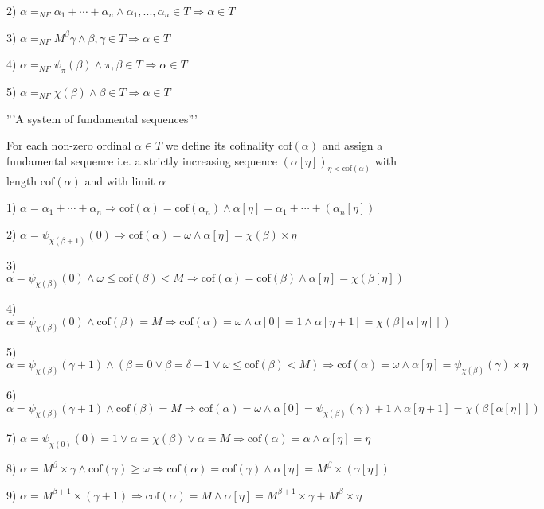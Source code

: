 \documentclass[10pt]{article}
\begin{document}
2) \(\alpha=_{NF}\alpha_1+\cdots+\alpha_n\wedge\alpha_1,...,\alpha_n\in T\Rightarrow\alpha\in T\)

3) \(\alpha=_{NF}M^\beta\gamma\wedge\beta,\gamma\in T\Rightarrow\alpha\in T\)

4) \(\alpha=_{NF}\psi_\pi(\beta)\wedge\pi,\beta\in T\Rightarrow\alpha\in T\)

5) \(\alpha=_{NF}\chi(\beta)\wedge\beta\in T\Rightarrow\alpha\in T\)

'''A system of fundamental sequences'''

For each non-zero ordinal \(\alpha\in T\) we define its cofinality \(\text{cof}(\alpha)\) and assign a fundamental sequence i.e. a strictly increasing sequence \((\alpha[\eta])_{\eta<\text{cof}(\alpha)}\) with length \(\text{cof}(\alpha)\) and with limit \(\alpha\)

1) \(\alpha=\alpha_1+\cdots+\alpha_n\Rightarrow\text{cof}(\alpha)=\text{cof}(\alpha_n)\wedge\alpha[\eta]=\alpha_1+\cdots+(\alpha_n[\eta])\)

2) \(\alpha=\psi_{\chi(\beta+1)}(0)\Rightarrow\text{cof}(\alpha)=\omega\wedge\alpha[\eta]=\chi(\beta)\times \eta\)

3) \(\alpha=\psi_{\chi(\beta)}(0)\wedge\omega\le\text{cof}(\beta)<M\Rightarrow\text{cof}(\alpha)=\text{cof}(\beta)\wedge\alpha[\eta]=\chi(\beta[\eta])\)

4) \(\alpha=\psi_{\chi(\beta)}(0)\wedge\text{cof}(\beta)=M\Rightarrow\text{cof}(\alpha)=\omega\wedge\alpha[0]=1\wedge\alpha[\eta+1]=\chi(\beta[\alpha[\eta]])\)

5)  \(\alpha=\psi_{\chi(\beta)}(\gamma+1)\wedge(\beta=0\vee\beta=\delta+1\vee\omega\le\text{cof}(\beta)<M)\Rightarrow\text{cof}(\alpha)=\omega\wedge\alpha[\eta]=\psi_{\chi(\beta)}(\gamma)\times \eta\)

6)  \(\alpha=\psi_{\chi(\beta)}(\gamma+1)\wedge\text{cof}(\beta)=M\Rightarrow\text{cof}(\alpha)=\omega\wedge\alpha[0]=\psi_{\chi(\beta)}(\gamma)+1\wedge\alpha[\eta+1]=\chi(\beta[\alpha[\eta]])\)

7)  \(\alpha=\psi_{\chi(0)}(0)=1\vee\alpha=\chi(\beta)\vee\alpha=M\Rightarrow\text{cof}(\alpha)=\alpha\wedge\alpha[\eta]=\eta\)

8) \(\alpha=M^{\beta}\times\gamma \wedge \text{cof} (\gamma)\geq\omega \Rightarrow \text{cof} (\alpha)= \text{cof}(\gamma)\wedge\alpha[\eta]=M^{\beta}\times(\gamma[\eta])\)

9) \(\alpha=M^{\beta+1}\times(\gamma+1) \Rightarrow \text{cof} (\alpha)=M \wedge\alpha[\eta]=M^{\beta+1}\times\gamma+M^\beta\times\eta\)
\end{document}
